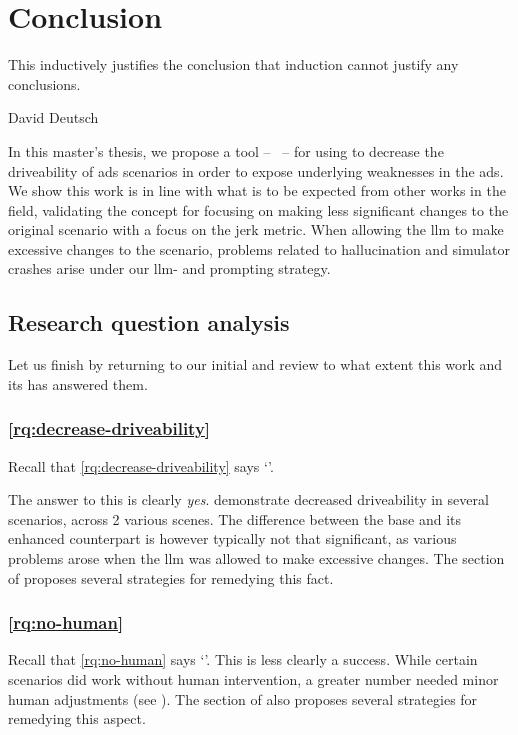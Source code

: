\chapter{Conclusion}\label{chp:conclusion}

\epigraph{This inductively justifies the conclusion that induction cannot justify any conclusions.}{David Deutsch}

In this master's thesis, we propose a tool -- \hefe{}~-- for using  to decrease the
driveability of \acrfull{ads} scenarios in order to expose underlying weaknesses in the
\acrshort{ads}. We show this work is in line with what is to be expected from other works in the
field, validating the concept for focusing on making less significant changes to the original
scenario with a focus on the jerk metric. When allowing the \acrshort{llm} to make excessive changes
to the scenario, problems related to hallucination and simulator crashes arise under our
\acrshort{llm}- and prompting strategy.

\section{Research question analysis}

Let us finish by returning to our initial  and review to what
extent this work and its  has answered them.

\subsection{\ref{rq:decrease-driveability}}

Recall that \ref{rq:decrease-driveability} says `'.

The answer to this is clearly \emph{yes}.  demonstrate
decreased driveability in several scenarios, across 2 various scenes. The difference between the
base and its enhanced counterpart is however typically not that significant, as various problems
arose when the \acrshort{llm} was allowed to make excessive changes. The  section of
 proposes several strategies for remedying this fact.

\subsection{\ref{rq:no-human}}

Recall that \ref{rq:no-human} says `'. This is less clearly a success. While
certain scenarios did work without human intervention, a greater number needed minor human
adjustments (see ). The  section of  also proposes several strategies for remedying this aspect.

